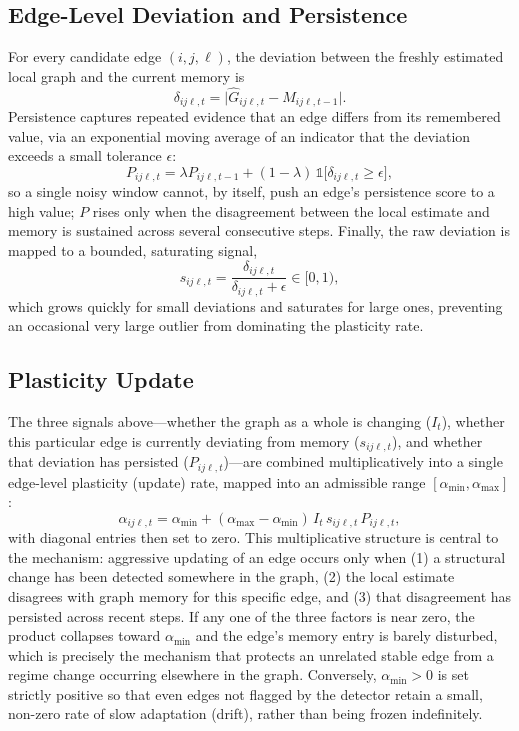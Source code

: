 \documentclass{ieeeaccess}
\newcommand{\Ghat}{\hat{G}}
\newcommand{\amin}{\alpha_{\min}}
\newcommand{\amax}{\alpha_{\max}}
\begin{document}
\subsection{Edge-Level Deviation and Persistence}
\label{sec:edge}
For every candidate edge $(i,j,\ell)$, the deviation between the freshly estimated local graph and the current memory is
\begin{equation}
\delta_{ij\ell,t}=\lvert\Ghat_{ij\ell,t}-M_{ij\ell,t-1}\rvert.
\label{eq:dev}
\end{equation}
Persistence captures repeated evidence that an edge differs from its remembered value, via an exponential moving average of an indicator that the deviation exceeds a small tolerance $\epsilon$:
\begin{equation}
P_{ij\ell,t}=\lambda P_{ij\ell,t-1}+(1-\lambda)\,\mathbb{1}\bigl[\delta_{ij\ell,t}\ge\epsilon\bigr],
\label{eq:persist}
\end{equation}
so a single noisy window cannot, by itself, push an edge's persistence score to a high value; $P$ rises only when the disagreement between the local estimate and memory is sustained across several consecutive steps. Finally, the raw deviation is mapped to a bounded, saturating signal,
\begin{equation}
s_{ij\ell,t}=\frac{\delta_{ij\ell,t}}{\delta_{ij\ell,t}+\epsilon}\in[0,1),
\label{eq:sat}
\end{equation}
which grows quickly for small deviations and saturates for large ones, preventing an occasional very large outlier from dominating the plasticity rate.

\subsection{Plasticity Update}
\label{sec:plastic}
The three signals above---whether the graph as a whole is changing ($I_t$), whether this particular edge is currently deviating from memory ($s_{ij\ell,t}$), and whether that deviation has persisted ($P_{ij\ell,t}$)---are combined multiplicatively into a single edge-level plasticity (update) rate, mapped into an admissible range $[\amin,\amax]$:
\begin{equation}
\alpha_{ij\ell,t}=\amin+(\amax-\amin)\,I_t\,s_{ij\ell,t}\,P_{ij\ell,t},
\label{eq:alpha}
\end{equation}
with diagonal entries then set to zero. This multiplicative structure is central to the mechanism: aggressive updating of an edge occurs only when (1) a structural change has been detected somewhere in the graph, (2) the local estimate disagrees with graph memory for this specific edge, and (3) that disagreement has persisted across recent steps. If any one of the three factors is near zero, the product collapses toward $\amin$ and the edge's memory entry is barely disturbed, which is precisely the mechanism that protects an unrelated stable edge from a regime change occurring elsewhere in the graph. Conversely, $\amin>0$ is set strictly positive so that even edges not flagged by the detector retain a small, non-zero rate of slow adaptation (drift), rather than being frozen indefinitely.
\end{document}
